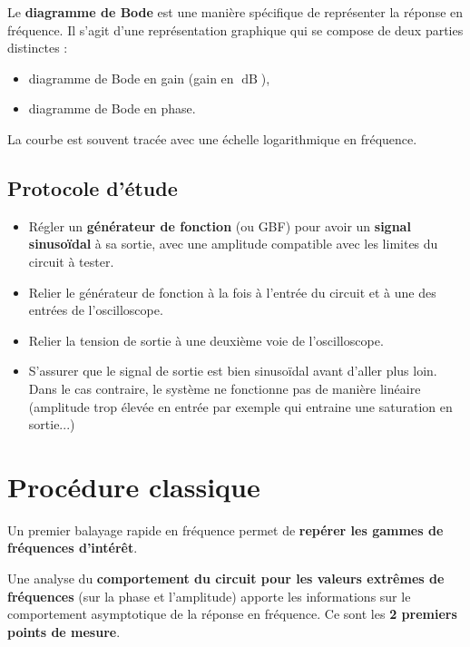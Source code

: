 Le \textbf{diagramme de Bode} est une manière spécifique de représenter la réponse en fréquence. Il s'agit d'une représentation graphique qui se compose de deux parties distinctes :

\begin{itemize}
	\item diagramme de Bode en gain (gain en $\operatorname{dB}$),
	\item diagramme de Bode en phase.
\end{itemize}

La courbe est souvent tracée avec une échelle logarithmique en fréquence. 

\subsection*{Protocole d'étude}

\begin{itemize}
	\item Régler un \textbf{générateur de fonction} (ou GBF) pour avoir un \textbf{signal sinusoïdal} à sa sortie, avec une amplitude compatible avec les limites du circuit à tester.
	\item Relier le générateur de fonction à la fois à l'entrée du circuit et à une des entrées de l'oscilloscope.
	\item Relier la tension de sortie à une deuxième voie de l'oscilloscope.
	\item S'assurer que le signal de sortie est bien sinusoïdal avant d'aller plus loin. Dans le cas contraire, le système ne fonctionne pas de manière linéaire (amplitude trop élevée en entrée par exemple qui entraine une saturation en sortie...)
\end{itemize}


\section{Procédure classique}

Un premier balayage rapide en fréquence permet de \textbf{repérer les gammes de fréquences d'intérêt}.

Une analyse du \textbf{comportement du circuit pour les valeurs extrêmes de fréquences} (sur la phase et l'amplitude) apporte les informations sur le comportement asymptotique de la réponse en fréquence. Ce sont les \textbf{2 premiers points de mesure}.


